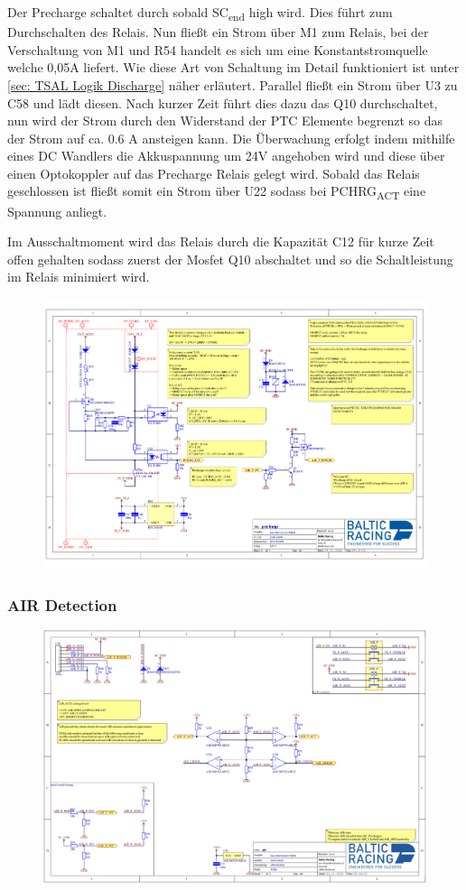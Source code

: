 Der Precharge schaltet durch sobald SC\textsubscript{end} high wird. Dies führt zum Durchschalten des Relais. Nun fließt ein Strom über M1 zum Relais, bei der Verschaltung von M1 und R54 handelt es sich um eine Konstantstromquelle welche 0,05A liefert. Wie diese Art von Schaltung im Detail funktioniert ist unter \ref{sec: TSAL Logik Discharge} näher erläutert. Parallel fließt ein Strom über U3 zu C58 und lädt diesen. Nach kurzer Zeit führt dies dazu das Q10 durchschaltet, nun wird der Strom durch den Widerstand der PTC Elemente begrenzt so das der Strom auf ca. 0.6 A ansteigen kann. Die Überwachung erfolgt indem mithilfe eines DC Wandlers die Akkuspannung um 24V angehoben wird und diese über einen Optokoppler auf das Precharge Relais gelegt wird. Sobald das Relais geschlossen ist fließt somit ein Strom über U22 sodass bei PCHRG\textsubscript{ACT} eine Spannung anliegt.

Im Ausschaltmoment wird das Relais durch die Kapazität C12 für kurze Zeit offen gehalten sodass zuerst der Mosfet Q10 abschaltet und so die Schaltleistung im Relais minimiert wird.

\begin{figure}
	\centering
	\includegraphics[width=0.7\linewidth]{bilder/Precharge_Complete}
	\caption{}
	\label{fig:prechargecomplete}
\end{figure}
\FloatBarrier

\subsubsection{AIR Detection}

\begin{figure}
	\centering
	\includegraphics[width=0.7\linewidth]{bilder/AIR_conditioning}
	\caption{}
	\label{fig:airconditioning}
\end{figure}

